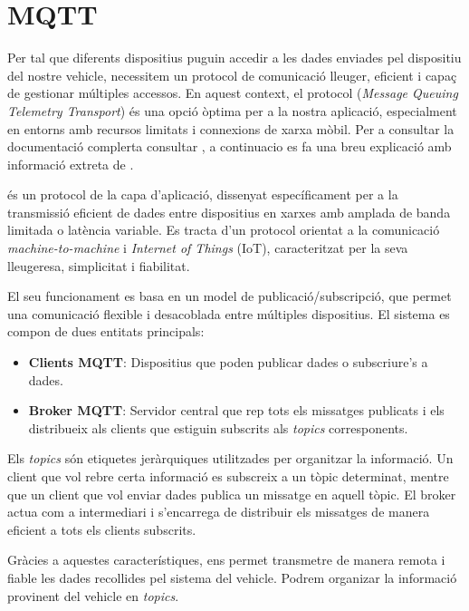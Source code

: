 \documentclass{tfgitic}[2024/07/01]
\begin{document}
\section{MQTT}

Per tal que diferents dispositius puguin accedir a les dades enviades pel dispositiu del nostre vehicle, necessitem un protocol de comunicació lleuger, eficient i capaç de gestionar 
múltiples accessos. En aquest context, el protocol  (\textit{Message Queuing Telemetry Transport}) és una opció òptima per a la nostra aplicació, especialment en entorns amb recursos 
limitats i connexions de xarxa mòbil. Per a consultar la documentació complerta consultar \cite{oasis_mqtt}, a continuacio es fa una breu explicació amb informació extreta de \cite{wikipedia_mqtt}.

 és un protocol de la capa d'aplicació, dissenyat específicament per a la transmissió eficient de dades entre dispositius en xarxes amb amplada de banda limitada o latència variable. 
Es tracta d'un protocol orientat a la comunicació \textit{machine-to-machine} i \textit{Internet of Things} (IoT), caracteritzat per la seva lleugeresa, simplicitat i fiabilitat.

El seu funcionament es basa en un model de publicació/subscripció, que permet una comunicació flexible i desacoblada entre múltiples dispositius. El sistema es compon de dues entitats principals:

\begin{itemize}
  \item \textbf{Clients MQTT}: Dispositius que poden publicar dades o subscriure's a dades.
  
  \item \textbf{Broker MQTT}: Servidor central que rep tots els missatges publicats i els distribueix als clients que estiguin subscrits als \textit{topics} corresponents.
\end{itemize} 

Els \textit{topics} són etiquetes jeràrquiques utilitzades per organitzar la informació. Un client que vol rebre certa informació es subscreix a un tòpic determinat, mentre que un client que vol enviar 
dades publica un missatge en aquell tòpic. El broker actua com a intermediari i s'encarrega de distribuir els missatges de manera eficient a tots els clients subscrits.

Gràcies a aquestes característiques,  ens permet transmetre de manera remota i fiable les dades recollides pel sistema  del vehicle. Podrem organizar la informació provinent del vehicle 
en \textit{topics}.
\end{document}
